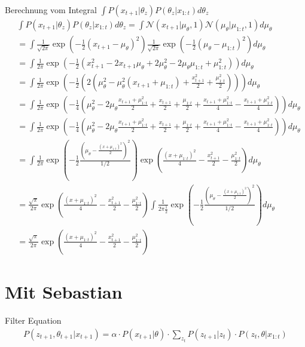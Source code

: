 \documentclass{article}
\begin{document}
Berechnung vom Integral $\int P(x_{t+1}|\theta_z) P(\theta_z|x_{1:t}) d\theta_z$
\begin{align}
    &\int P(x_{t+1}|\theta_z) P(\theta_z|x_{1:t}) d\theta_z = \int \mathcal{N}(x_{t+1}|\mu_\theta,1) \mathcal{N}(\mu_\theta|\mu_{1:t},1) d\mu_\theta
    \\
    &= \int \frac{1}{\sqrt{2\pi}}\exp(-\frac{1}{2}(x_{t+1}-\mu_\theta)^2) \frac{1}{\sqrt{2\pi}}\exp(-\frac{1}{2}(\mu_\theta-\mu_{1:t})^2)d\mu_\theta
    \\
    &= \int \frac{1}{2\pi}\exp(-\frac{1}{2}(x_{t+1}^2-2x_{t+1}\mu_\theta + 2\mu_\theta^2 - 2\mu_\theta\mu_{1:t}+\mu_{1:t}^2))d\mu_\theta
    \\
    &= \int \frac{1}{2\pi}\exp(-\frac{1}{2}(2(\mu_\theta^2 - \mu_\theta^2(x_{t+1}+\mu_{1:t})+\frac{x_{t+1}^2}{2}+\frac{\mu_{1:t}^2}{2})))d\mu_\theta
    \\
    &= \int \frac{1}{2\pi}\exp(-\frac{1}{4}(\mu_\theta^2 - 2\mu_\theta\frac{x_{t+1}+\mu_{1:t}^2}{2} + \frac{x_{t+1}}{2} + \frac{\mu_{1:t}}{2} + \frac{x_{t+1}+\mu_{1:t}^2}{4} - \frac{x_{t+1}+\mu_{1:t}^2}{4}))d\mu_\theta
    \\
    &= \int \frac{1}{2\pi}\exp(-\frac{1}{4}(\mu_\theta^2 - 2\mu_\theta\frac{x_{t+1}+\mu_{1:t}^2}{2} + \frac{x_{t+1}}{2} + \frac{\mu_{1:t}}{2} + \frac{x_{t+1}+\mu_{1:t}^2}{4} - \frac{x_{t+1}+\mu_{1:t}^2}{4}))d\mu_\theta
    \\
    &= \int \frac{1}{2\pi}\exp(-\frac{1}{2}\frac{(\mu_\theta - \frac{(x+\mu_{1:t})^2}{2})^2}{1/2})\exp(\frac{(x+\mu_{1:t})^2}{4} - \frac{x_{t+1}^2}{2} - \frac{\mu_{1:t}^2}{2})d\mu_\theta
    \\
    &= \frac{\sqrt{\pi}}{2\pi}\exp(\frac{(x+\mu_{1:t})^2}{4} - \frac{x_{t+1}^2}{2} - \frac{\mu_{1:t}^2}{2}) \int \frac{1}{2\pi\frac{1}{2}}\exp(-\frac{1}{2}\frac{(\mu_\theta - \frac{(x+\mu_{1:t})^2}{2})^2}{1/2})d\mu_\theta
    \\
    &= \frac{\sqrt{\pi}}{2\pi}\exp(\frac{(x+\mu_{1:t})^2}{4} - \frac{x_{t+1}^2}{2} - \frac{\mu_{1:t}^2}{2})
\end{align}


\section{Mit Sebastian}
Filter Equation
\begin{align}
    P(z_{t+1},\theta_{t+1} |  x_{t+1}) = \alpha \cdot P(x_{t+1} | \theta) \cdot \sum_{z_t}P(z_{t+1}|z_{t}) \cdot P(z_{t}, \theta | x_{1:t})
\end{align}
\end{document}
